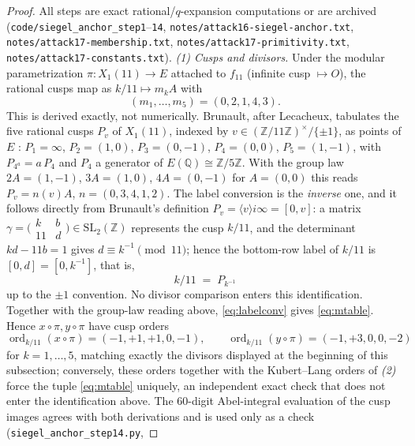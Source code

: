 \documentclass[preprint,12pt]{elsarticle}
\theoremstyle{definition}
\theoremstyle{remark}
\newcommand{\Q}{\mathbb{Q}}
\newcommand{\Z}{\mathbb{Z}}
\begin{document}
\begin{proof}
All steps are exact rational/$q$-expansion computations or are archived
(\texttt{code/siegel\_anchor\_step1}--\texttt{14},
\texttt{notes/attack16-siegel-anchor.txt},
\texttt{notes/attack17-membership.txt},
\texttt{notes/attack17-primitivity.txt},
\texttt{notes/attack17-constants.txt}).
\emph{(1) Cusps and divisors.}  Under the modular parametrization
$\pi\colon X_1(11)\to E$ attached to $f_{11}$ (infinite cusp $\mapsto O$),
the rational cusps map as $k/11\mapsto m_kA$ with
\begin{equation}\label{eq:mtable}
  (m_1,\dots,m_5)=(0,2,1,4,3).
\end{equation}
This is derived exactly, not numerically.  Brunault, after Lecacheux,
tabulates the five rational cusps $P_v$ of $X_1(11)$, indexed by
$v\in(\Z/11\Z)^\times/\{\pm1\}$, as points of $E$
\cite[(3.152)--(3.153)]{Brunault}: $P_1=\infty$, $P_2=(1,0)$,
$P_3=(0,-1)$, $P_4=(0,0)$, $P_5=(1,-1)$, with $P_{4^a}=a\,P_4$ and $P_4$
a generator of $E(\Q)\cong\Z/5\Z$.  With the group law $2A=(1,-1)$,
$3A=(1,0)$, $4A=(0,-1)$ for $A=(0,0)$ this reads $P_v=n(v)A$,
$n=(0,3,4,1,2)$.  The label conversion is the \emph{inverse} one, and it
follows directly from Brunault's definition
$P_v=\langle v\rangle i\infty=[0,v]$: a matrix
$\gamma=\bigl(\begin{smallmatrix}k&b\\11&d\end{smallmatrix}\bigr)
 \in\mathrm{SL}_2(\Z)$
represents the cusp $k/11$, and the determinant $kd-11b=1$ gives
$d\equiv k^{-1}\pmod{11}$; hence the bottom-row label of $k/11$ is
$[0,d]=[0,k^{-1}]$, that is,
\begin{equation}\label{eq:labelconv}
  k/11 \;=\; P_{k^{-1}}
\end{equation}
up to the $\pm1$ convention.  No divisor comparison enters this
identification.  Together with the group-law reading above,
\eqref{eq:labelconv} gives \eqref{eq:mtable}.  Hence
$x\circ\pi,y\circ\pi$ have cusp orders
\[
  \operatorname{ord}_{k/11}(x\circ\pi)=(-1,+1,+1,0,-1),\qquad
  \operatorname{ord}_{k/11}(y\circ\pi)=(-1,+3,0,0,-2)
\]
for $k=1,\dots,5$, matching exactly the divisors displayed at the
beginning of this subsection; conversely, these orders together with the
Kubert--Lang orders of \emph{(2)} force the tuple \eqref{eq:mtable}
uniquely, an independent exact check that does not enter the
identification above.  The $60$-digit Abel-integral
evaluation of the cusp images agrees with both derivations and is used
only as a check (\texttt{siegel\_anchor\_step14.py},

\end{proof}
\end{document}
